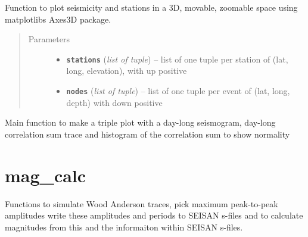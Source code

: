 \documentclass[a4paper,10pt,english]{sphinxmanual}
\begin{document}

\begin{fulllineitems}
\label{modules:EQcorrscan_plotting.threeD_seismplot}
Function to plot seismicity and stations in a 3D, movable, zoomable space
using matplotlibs Axes3D package.
\begin{quote}\begin{description}
\item[{Parameters}] \leavevmode\begin{itemize}
\item {} 
\textbf{\texttt{stations}} (\emph{list of tuple}) -- list of one tuple per station of (lat, long, elevation),
with up positive

\item {} 
\textbf{\texttt{nodes}} (\emph{list of tuple}) -- list of one tuple per event of (lat, long, depth) with down
positive

\end{itemize}

\end{description}\end{quote}

\end{fulllineitems}


\begin{fulllineitems}
\label{modules:EQcorrscan_plotting.triple_plot}
Main function to make a triple plot with a day-long seismogram, day-long
correlation sum trace and histogram of the correlation sum to show normality
\begin{quote}\begin{description}
\end{description}\end{quote}

\end{fulllineitems}



\section{mag\_calc}
\label{modules:module-mag_calc}\label{modules:mag-calc}
Functions to simulate Wood Anderson traces, pick maximum peak-to-peak amplitudes
write these amplitudes and periods to SEISAN s-files and to calculate magnitudes
from this and the informaiton within SEISAN s-files.
\end{document}

